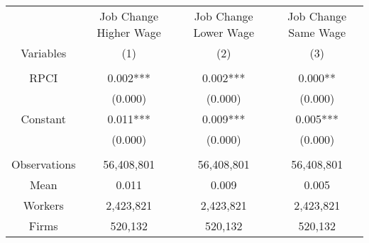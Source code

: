 \begin{tabular}{c|ccc}
\toprule
\toprule
      & Job Change Higher Wage & Job Change Lower Wage & Job Change Same Wage \\
Variables & (1)   & (2)   & (3) \\
\midrule
      &       &       &  \\
RPCI  & 0.002*** & 0.002*** & 0.000** \\
      & (0.000) & (0.000) & (0.000) \\
Constant & 0.011*** & 0.009*** & 0.005*** \\
      & (0.000) & (0.000) & (0.000) \\
      &       &       &  \\
\midrule
Observations & 56,408,801 & 56,408,801 & 56,408,801 \\
Mean  & 0.011 & 0.009 & 0.005 \\
Workers & 2,423,821 & 2,423,821 & 2,423,821 \\
Firms & 520,132 & 520,132 & 520,132 \\
\bottomrule
\bottomrule
\end{tabular}%

